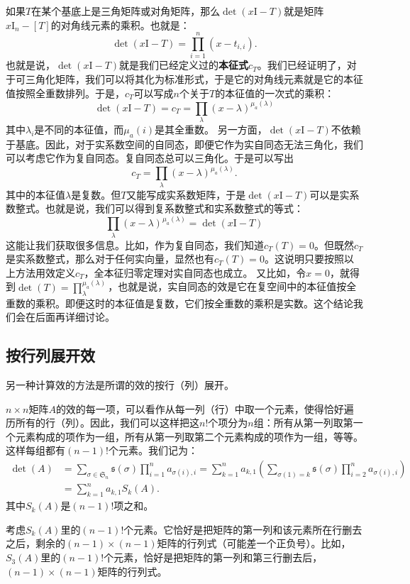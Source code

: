 \documentclass[12pt,UTF8,fontset=none]{ctexbook}
\begin{document}
如果$T$在某个基底上是三角矩阵或对角矩阵，那么$\det(x \mathrm{I} - T)$就是矩阵$x\mathrm{I}_n - [T]$的对角线元素的乘积。也就是：
$$
\det(x \mathrm{I} - T) = \prod_{i=1}^n (x - t_{i,i}).
$$
也就是说，$\det(x \mathrm{I} - T)$就是我们已经定义过的\textbf{本征式}$c_T$。我们已经证明了，对于可三角化矩阵，我们可以将其化为标准形式，于是它的对角线元素就是它的本征值按照全重数排列。于是，$c_T$可以写成$n$个关于$T$的本征值的一次式的乘积：
$$
\det(x \mathrm{I} - T) = c_T = \prod_{\lambda} (x - \lambda)^{\mu_a(\lambda)}
$$
其中$\lambda_i$是不同的本征值，而$\mu_a(i)$是其全重数。
另一方面，$\det(x \mathrm{I} - T)$不依赖于基底。因此，对于实系数空间的自同态，即便它作为实自同态无法三角化，我们可以考虑它作为复自同态。复自同态总可以三角化。于是可以写出
$$c_T = \prod_{\lambda} (x - \lambda)^{\mu_a(\lambda)}.$$
其中的本征值$\lambda$是复数。但$T$又能写成实系数矩阵，于是$\det(x \mathrm{I} - T)$可以是实系数整式。也就是说，我们可以得到复系数整式和实系数整式的等式：
$$ \prod_{\lambda} (x - \lambda)^{\mu_a(\lambda)} = \det(x \mathrm{I} - T) $$
这能让我们获取很多信息。比如，作为复自同态，我们知道$c_T(T) = 0$。但既然$c_T$是实系数整式，那么对于任何实向量，显然也有$c_T(T) = 0$。这说明只要按照以上方法用效定义$c_T$，全本征归零定理对实自同态也成立。
又比如，令$x = 0$，就得到$\det(T) = \prod_{\lambda}^{\mu_a(\lambda)}$，也就是说，实自同态的效是它在复空间中的本征值按全重数的乘积。即便这时的本征值是复数，它们按全重数的乘积是实数。这个结论我们会在后面再详细讨论。

\subsection{按行列展开效}
另一种计算效的方法是所谓的效的按行（列）展开。

$n\times n$矩阵$A$的效的每一项，可以看作从每一列（行）中取一个元素，使得恰好遍历所有的行（列）。因此，我们可以这样把这$n!$个项分为$n$组：所有从第一列取第一个元素构成的项作为一组，所有从第一列取第二个元素构成的项作为一组，等等。这样每组都有$(n-1)!$个元素。我们记为：
\begin{align*}
    \det(A) &= \sum_{\sigma\in\mathfrak{S}_n} \mathfrak{s}(\sigma) \prod_{i=1}^n a_{\sigma(i),i} = \sum_{k=1}^n a_{k,1}\left( \sum_{\sigma(1)=k} \mathfrak{s}(\sigma) \prod_{i=2}^n a_{\sigma(i),i}\right) \\
    &= \sum_{k=1}^n a_{k,1} S_k(A).
\end{align*}
其中$S_k(A)$是$(n-1)!$项之和。

考虑$S_k(A)$里的$(n-1)!$个元素。它恰好是把矩阵的第一列和该元素所在行删去之后，剩余的$(n-1)\times (n-1)$矩阵的行列式（可能差一个正负号）。比如，$S_3(A)$里的$(n-1)!$个元素，恰好是把矩阵的第一列和第三行删去后，$(n-1)\times (n-1)$矩阵的行列式。
\end{document}
